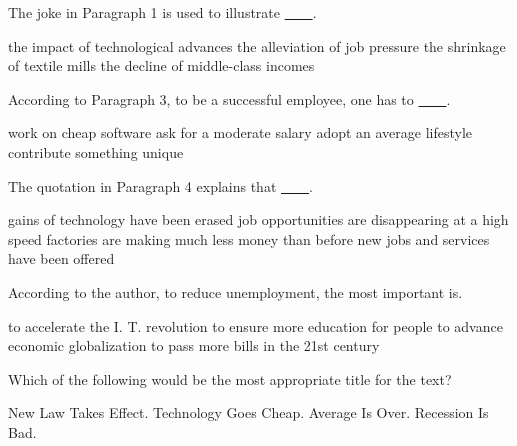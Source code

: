 \item The joke in Paragraph 1 is used to illustrate \uline{~~~~}.
\begin{tasks}
	\task the impact of technological advances
	\task the alleviation of job pressure
	\task the shrinkage of textile mills
	\task the decline of middle-class incomes
\end{tasks}
\item According to Paragraph 3, to be a successful employee, one has to \uline{~~~~}.
\begin{tasks}
	\task work on cheap software
	\task ask for a moderate salary
	\task adopt an average lifestyle
	\task contribute something unique
\end{tasks}
\item The quotation in Paragraph 4 explains that \uline{~~~~}.
\begin{tasks}
	\task gains of technology have been erased
	\task job opportunities are disappearing at a high speed
	\task factories are making much less money than before
	\task new jobs and services have been offered
\end{tasks}
\item According to the author, to reduce unemployment, the most important is.
\begin{tasks}
	\task to accelerate the I. T. revolution
	\task to ensure more education for people
	\task to advance economic globalization
	\task to pass more bills in the 21st century
\end{tasks}
\item Which of the following would be the most appropriate title for the text?
\begin{tasks}
	\task New Law Takes Effect.
	\task Technology Goes Cheap.
	\task Average Is Over.
	\task Recession Is Bad.
\end{tasks}